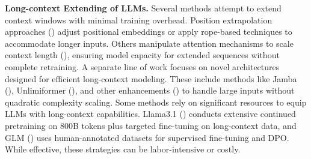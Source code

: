 \textbf{Long-context Extending of LLMs.}
Several methods attempt to extend context windows with minimal training overhead. Position extrapolation approaches (\cite{chen2023extendingcontextwindowlarge, pengyarn, su2021roformer, dinglongrope, chen2024clex, liu-etal-2024-e2, zhu2024pose, wu2024skipalign, longrecipe}) adjust positional embeddings or apply rope-based techniques to accommodate longer inputs. Others manipulate attention mechanisms to scale context length (\cite{jin2024selfextend, xiao2024sink, xiao2024infllm, ding2023longnet, antraining, an2025why}), ensuring model capacity for extended sequences without complete retraining.
A separate line of work focuses on novel architectures designed for efficient long-context modeling. These include methods like Jamba (\cite{lieber2024jamba}), Unlimiformer (\cite{bertsch2024unlimiformer}), and other enhancements (\cite{wang2024augmenting, yen2024long}) to handle large inputs without quadratic complexity scaling.
Some methods rely on significant resources to equip LLMs with long-context capabilities. Llama3.1 (\cite{dubey2024llama}) conducts extensive continued pretraining on 800B tokens plus targeted fine-tuning on long-context data, and GLM (\cite{glm2024chatglm}) uses human-annotated datasets for supervised fine-tuning and DPO. While effective, these strategies can be labor-intensive or costly.
